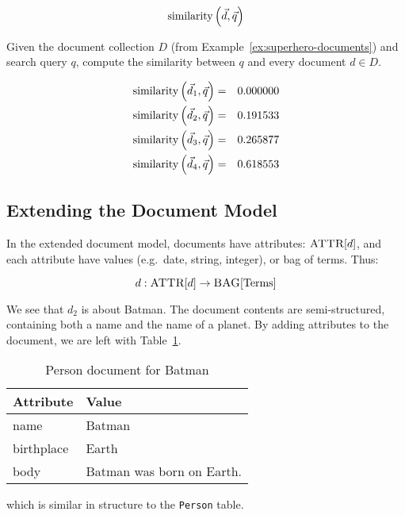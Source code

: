 		$$\operatorname{similarity}\left(\vec{d}, \vec{q}\right)$$
		
		\begin{ex}
			Given the document collection $D$ (from Example~\ref{ex:superhero-documents}) and search query $q$, compute the similarity between $q$ and every document $d \in D$.
			
			\begin{eqnarray}
				\operatorname{similarity}\left(\vec{d}_1, \vec{q}\right) &=& 0.000000 \\
				\operatorname{similarity}\left(\vec{d}_2, \vec{q}\right) &=& 0.191533 \\
				\operatorname{similarity}\left(\vec{d}_3, \vec{q}\right) &=& 0.265877 \\
				\operatorname{similarity}\left(\vec{d}_4, \vec{q}\right) &=& 0.618553
			\end{eqnarray}
		\end{ex}
		
	\subsection{Extending the Document Model}
	\label{sec:extending-the-document-model}
		In the extended document model, documents have attributes: $\textsc{ATTR}\lbrack d\rbrack$, and each attribute have values (e.g.~date, string, integer), or bag of terms.  Thus:

		$$d:\textsc{ATTR}\lbrack d\rbrack \to \textsc{BAG}\lbrack \mathrm{Terms}\rbrack$$
		
		\begin{ex}
			We see that $d_2$ is about Batman.  The document contents are semi-structured, containing both a name and the name of a planet.  By adding attributes to the document, we are left with Table~\ref{tbl:person-document}.
			
			\begin{table}[!ht]
				\centering
				
				\begin{tabular}{ll}
					\toprule
					Attribute & Value \\
					\midrule
					name & Batman \\
					birthplace & Earth \\
					body & Batman was born on Earth. \\
					\bottomrule
				\end{tabular}
				
				\caption{Person document for Batman}
				\label{tbl:person-document}
			\end{table}
			
			which is similar in structure to the \texttt{Person} table.
		\end{ex}
		
